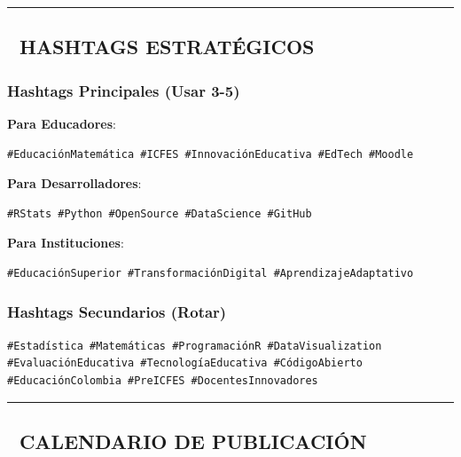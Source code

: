 \documentclass[
]{article}
\begin{document}
\begin{center}\rule{0.5\linewidth}{0.5pt}\end{center}

\subsection{🎯 HASHTAGS ESTRATÉGICOS}\label{hashtags-estratuxe9gicos}

\subsubsection{Hashtags Principales (Usar
3-5)}\label{hashtags-principales-usar-3-5}

\textbf{Para Educadores}:

\begin{verbatim}
#EducaciónMatemática #ICFES #InnovaciónEducativa #EdTech #Moodle
\end{verbatim}

\textbf{Para Desarrolladores}:

\begin{verbatim}
#RStats #Python #OpenSource #DataScience #GitHub
\end{verbatim}

\textbf{Para Instituciones}:

\begin{verbatim}
#EducaciónSuperior #TransformaciónDigital #AprendizajeAdaptativo
\end{verbatim}

\subsubsection{Hashtags Secundarios
(Rotar)}\label{hashtags-secundarios-rotar}

\begin{verbatim}
#Estadística #Matemáticas #ProgramaciónR #DataVisualization
#EvaluaciónEducativa #TecnologíaEducativa #CódigoAbierto
#EducaciónColombia #PreICFES #DocentesInnovadores
\end{verbatim}

\begin{center}\rule{0.5\linewidth}{0.5pt}\end{center}

\subsection{📅 CALENDARIO DE
PUBLICACIÓN}\label{calendario-de-publicaciuxf3n}
\end{document}
